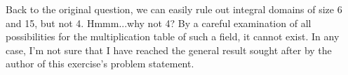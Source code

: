 \documentclass[12pt]{article}
\begin{document}
Back to the original question, we can easily rule out integral
domains of size 6 and 15, but not 4.  Hmmm...why not 4?
By a careful examination of all possibilities for the multiplication
table of such a field, it cannot exist.  In any case, I'm not sure
that I have reached the general result sought after by the
author of this exercise's problem statement.
\end{document}
